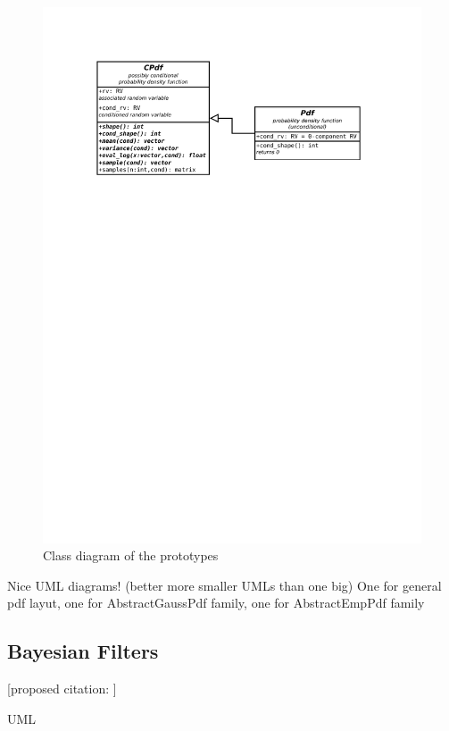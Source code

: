 \begin{figure}[h]
	\centering
	\includegraphics[width=\textwidth,keepaspectratio=true,clip=true,trim=3cm 204mm 3cm 3cm]{./diagrams/pdfs.pdf}
	\vspace{-8mm}
	\caption{Class diagram of the {\pdf} prototypes}
\end{figure}

Nice UML diagrams! (better more smaller UMLs than one big) One for general pdf layut, one for
AbstractGaussPdf family, one for AbstractEmpPdf family

\subsection{Bayesian Filters}

[proposed citation: \cite{Smi:05}]

UML

